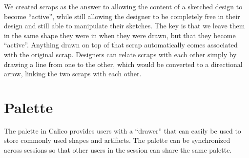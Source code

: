 We created scraps as the answer to allowing the content of a sketched design to become ``active'', while still allowing the designer to be completely free in their design and still able to manipulate their sketches.
The key is that we leave them in the same shape they were in when they were drawn, but that they become ``active''. 
Anything drawn on top of that scrap automatically comes associated with the original scrap.
Designers can relate scraps with each other simply by drawing a line from one to the other, which would be converted to a directional arrow, linking the two scraps with each other.

\section{Palette}
The palette in Calico provides users with a ``drawer'' that can easily be used to store commonly used shapes and artifacts.
The palette can be synchronized across sessions so that other users in the session can share the same palette.